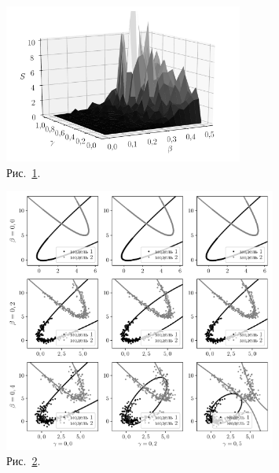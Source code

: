 \documentclass[12pt]{a&t}
\begin{document}
{\begin{figure}[h!]
\begin{center}
    \includegraphics[width=0.7\textwidth]{3dplot}
\end{center}
\caption{Рис.~\ref{ce:fig5}.}
\label{ce:fig5}
\end{figure}

\begin{figure}[h!]
\begin{center}
    \includegraphics[width=0.8\textwidth]{beta_gamma}
\end{center}
\caption{Рис.~\ref{ce:fig6}.}
\label{ce:fig6}
\end{figure}

}
\end{document}
